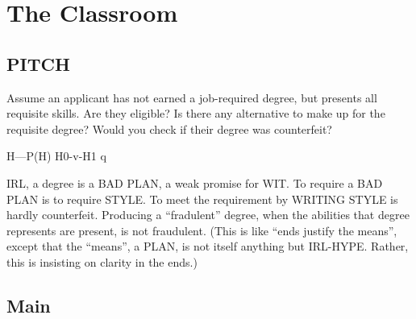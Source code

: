 \documentclass[
]{book}
\begin{document}
\hypertarget{the-classroom}{%
\section{The Classroom}\label{the-classroom}}

\hypertarget{pitch}{%
\subsection{PITCH}\label{pitch}}

Assume an applicant has not earned a job-required degree,
but presents all requisite skills.
Are they eligible?
Is there any alternative to make up for the requisite degree?
Would you check if their degree was counterfeit?

H---P(H)
\textbar{}
H0-v-H1
q

IRL, a degree is a BAD PLAN, a weak promise for WIT.
To require a BAD PLAN is to require STYLE. To meet the requirement by WRITING STYLE is hardly counterfeit.
Producing a ``fradulent'' degree, when the abilities that degree represents are present, is not fraudulent.
(This is like ``ends justify the means'', except that the ``means'', a PLAN, is not itself anything but IRL-HYPE. Rather, this is insisting on clarity in the ends.)

\hypertarget{main}{%
\subsection{Main}\label{main}}
\end{document}
